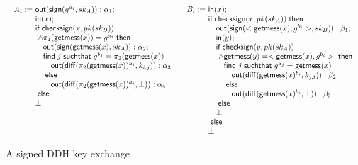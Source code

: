 \begin{figure}
\[
  \begin{array}{cc}
\begin{array}[t]{l@{~}l}
  A_i := & \aout{\mysign(g^{a_i},sk_A)} : \alpha_1; \\
         &\ain{x}; \\
         & \myif \mycsign(x,pk(sk_B)) \\
  & ~ \wedge \pi_1(\mygetmess(x))=g^{a_i}  \mythen \\
         & \quad \aout{\mysign(\mygetmess(x),sk_A) } : \alpha_2; \\
         & \quad \myfind j \mysuchthat g^{b_j} = \pi_2(\mygetmess(x)) \\
           & \qquad \aout{\diff{\pi_2(\mygetmess(x))^{a_i}}{k_{i,j}}} : \alpha_3\\
         & \quad \myelse \\
         & \qquad \aout{\diff{\pi_2(\mygetmess(x))^{a_i}}{\bot}}  : \alpha_4 \\
         & \myelse \\
           & \bot
\end{array}
&
\begin{array}[t]{l@{~}l}
  B_i := &\ain{x}; \\
         & \myif \mycsign(x,pk(sk_A)) \mythen \\
         & \quad \aout{\mysign(<\mygetmess(x), g^{b_i}>,sk_B)} : \beta_1; \\
         & \quad \ain{y}; \\
         & \quad \myif \mycsign(y,pk(sk_A))\\
  & \quad ~ \wedge \mygetmess(y) = <\mygetmess(x), g^{b_i}> \mythen \\
         & \quad \quad \myfind j \mysuchthat g^{a_j} = \mygetmess(x) \\
           & \quad \qquad \aout{\diff{\mygetmess(x)^{b_i}}{k_{j,i}}} : \beta_2 \\
         & \quad \quad \myelse \\
         & \quad \qquad \aout{\diff{\mygetmess(x)^{b_i}}{\bot}} : \beta_3 \\
         & \quad \myelse \\
           & \quad \bot \\
         & \myelse \\
           & \bot
\end{array}
\end{array}
\]
\label{fig:signed_ddh}
\caption{A signed DDH key exchange}
\end{figure}

